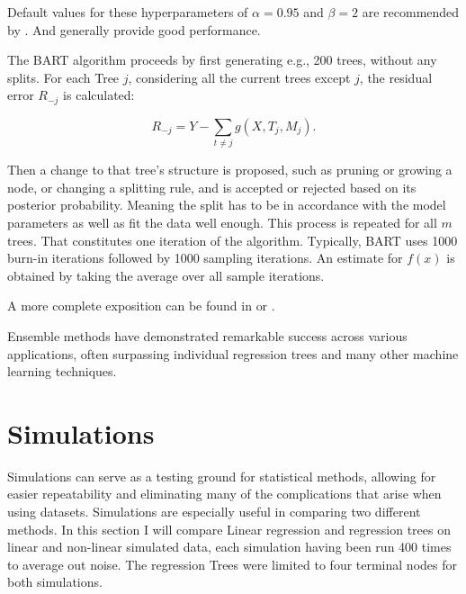 \documentclass[12pt]{article}
\begin{document}
Default values for these hyperparameters of $\alpha = 0.95$ and $\beta = 2$ are recommended by \citep{chipman2010}. And generally provide good performance.

The BART algorithm proceeds by first generating e.g., 200 trees, without any splits. For each Tree $j$, considering all the current trees except $j$, the residual error $R_{-j}$ is calculated:

\begin{equation}
    R_{-j} = Y - \sum_{t\not=j} g(X,T_j,M_j).
\end{equation}

Then a change to that tree's structure is proposed, such as pruning or growing a node, or changing a splitting rule, and is accepted or rejected based on its posterior probability. Meaning the split has to be in accordance with the model parameters as well as fit the data well enough. This process is repeated for all $m$ trees. That constitutes one iteration of the algorithm. Typically, BART uses 1000 burn-in iterations followed by 1000 sampling iterations. An estimate for $f(x)$ is obtained by taking the average over all sample iterations.

A more complete exposition can be found in \citep{tan2019} or \citep{chipman2010}.

Ensemble methods have demonstrated remarkable success across various applications, often surpassing individual regression trees and many other machine learning techniques.


\section{Simulations}

Simulations can serve as a testing ground for statistical methods, allowing for easier repeatability and eliminating many of the complications that arise when using datasets. Simulations are especially useful in comparing two different methods. In this section I will compare Linear regression and regression trees on linear and non-linear simulated data, each simulation having been run 400 times to average out noise. The regression Trees were limited to four terminal nodes for both simulations.
\end{document}
